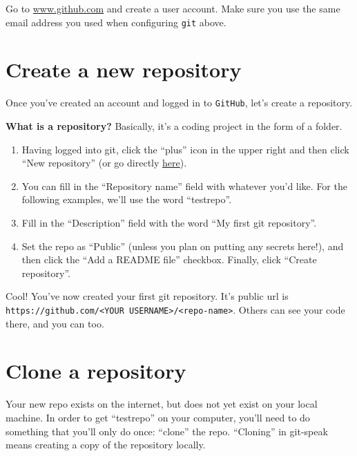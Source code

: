 \documentclass[]{book}
\begin{document}
Go to \url{www.github.com} and create a user account. Make sure you use the same email address you used when configuring \texttt{git} above.

\hypertarget{create-a-new-repository}{%
\section*{Create a new repository}\label{create-a-new-repository}}

Once you've created an account and logged in to \texttt{GitHub}, let's create a repository.

\textbf{What is a repository?} Basically, it's a coding project in the form of a folder.

\begin{enumerate}
\def\labelenumi{\arabic{enumi}.}
\item
  Having logged into git, click the ``plus'' icon in the upper right and then click ``New repository'' (or go directly \href{https://github.com/new}{here}).
\item
  You can fill in the ``Repository name'' field with whatever you'd like. For the following examples, we'll use the word ``testrepo''.
\item
  Fill in the ``Description'' field with the word ``My first git repository''.
\item
  Set the repo as ``Public'' (unless you plan on putting any secrets here!), and then click the ``Add a README file'' checkbox. Finally, click ``Create repository''.
\end{enumerate}

Cool! You've now created your first git repository. It's public url is \texttt{https://github.com/\textless{}YOUR\ USERNAME\textgreater{}/\textless{}repo-name\textgreater{}}. Others can see your code there, and you can too.

\hypertarget{clone-a-repository}{%
\section*{Clone a repository}\label{clone-a-repository}}

Your new repo exists on the internet, but does not yet exist on your local machine. In order to get ``testrepo'' on your computer, you'll need to do something that you'll only do once: ``clone'' the repo. ``Cloning'' in git-speak means creating a copy of the repository locally.
\end{document}
